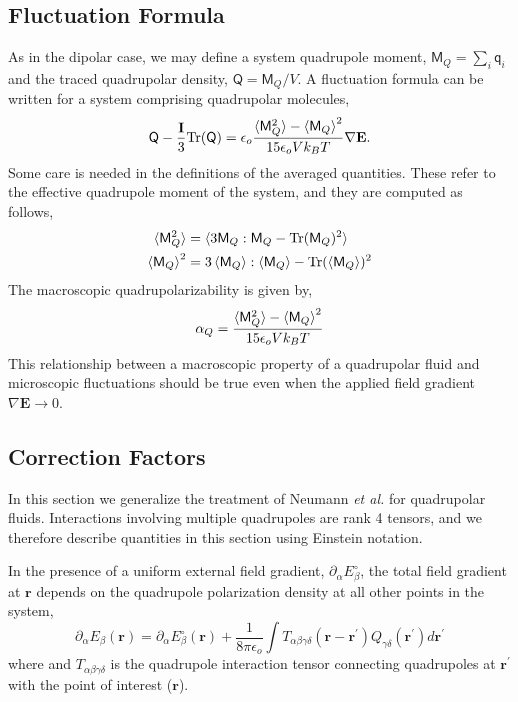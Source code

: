 \subsection{Fluctuation Formula}
As in the dipolar case, we may define a system quadrupole moment,
$\mathsf{M}_Q = \sum_i \mathsf{q}_i$ and the traced quadrupolar
density, $\mathsf{Q} = \mathsf{M}_Q / V$.  A fluctuation formula can
be written for a system comprising quadrupolar
molecules,\cite{LoganI81,LoganII82,LoganIII82}
\begin{equation}
\mathsf{Q} - \frac{\mathbf{I}}{3} \mathrm{Tr}(\mathsf{Q}) = \epsilon_o
\frac{\braket{\mathsf{M}_Q^2}-{\braket{\mathsf{M}_Q}}^2}{15 \epsilon_o
  V k_B T} \nabla\mathbf{E}.
\label{flucQuad}
\end{equation}
Some care is needed in the definitions of the averaged quantities.  These
refer to the effective quadrupole moment of the system, and they are
computed as follows,
\begin{align}
\braket{\mathsf{M}_Q^2} &= \braket{3 \mathsf{M}_Q:\mathsf{M}_Q -
  \mathrm{Tr}(\mathsf{M}_Q)^2 }\\
\braket{\mathsf{M}_Q}^2 &= 3 \braket{\mathsf{M}_Q}:\braket{\mathsf{M}_Q} -
\mathrm{Tr}(\braket{\mathsf{M}_Q})^2
\label{eq:flucQuad}
\end{align}
The macroscopic quadrupolarizability is given by,
\begin{equation}
  \alpha_Q = \frac{\braket{\mathsf{M}_Q^2}-{\braket{\mathsf{M}_Q}}^2}{15 \epsilon_o V k_B T}
\label{propConstQuad}
\end{equation}
This relationship between a macroscopic property of a quadrupolar
fluid and microscopic fluctuations should be true even when the
applied field gradient $\nabla \mathbf{E} \rightarrow 0$.

\subsection{Correction Factors}
In this section we generalize the treatment of Neumann \textit{et al.}
for quadrupolar fluids. Interactions involving multiple quadrupoles
are rank 4 tensors, and we therefore describe quantities in this
section using Einstein notation.

In the presence of a uniform external field gradient,
$\partial_\alpha {E}^\circ_\beta $, the total field gradient at
$\mathbf{r}$ depends on the quadrupole polarization density at all
other points in the system,
\begin{equation}
\partial_\alpha E_\beta(\mathbf{r}) = \partial_\alpha
{E}^\circ_\beta(\mathbf{r}) + \frac{1}{8\pi \epsilon_o}\int
T_{\alpha\beta\gamma\delta}({\mathbf{r}-\mathbf{r}^\prime})
Q_{\gamma\delta}(\mathbf{r}^\prime) d\mathbf{r}^\prime 
\label{gradMaxwell}
\end{equation}
where and $T_{\alpha\beta\gamma\delta}$ is the quadrupole interaction
tensor connecting quadrupoles at $\mathbf{r}^\prime$ with the point of
interest ($\mathbf{r}$).

